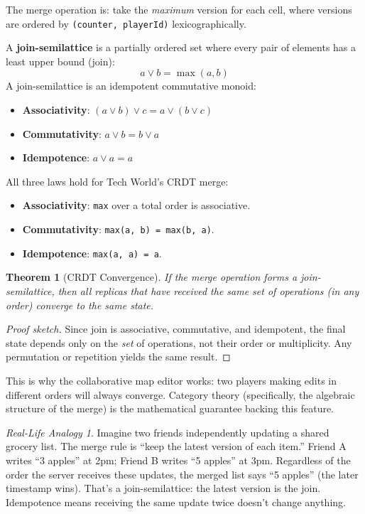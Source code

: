 \documentclass[12pt,a4paper]{article}
\theoremstyle{definition}
\theoremstyle{plain}
\newtheorem{theorem}[definition]{Theorem}
\theoremstyle{remark}
\newtheorem*{reallife}{Real-Life Analogy}
\begin{document}
The merge operation is: take the \emph{maximum} version for each cell,
where versions are ordered by \texttt{(counter, playerId)} lexicographically.

\begin{formal}
A \textbf{join-semilattice} is a partially ordered set where every pair of
elements has a least upper bound (join):
\[
a \vee b = \max(a, b)
\]
A join-semilattice is an idempotent commutative monoid:
\begin{itemize}
  \item \textbf{Associativity}: $(a \vee b) \vee c = a \vee (b \vee c)$
  \item \textbf{Commutativity}: $a \vee b = b \vee a$
  \item \textbf{Idempotence}: $a \vee a = a$
\end{itemize}
\end{formal}

All three laws hold for Tech World's CRDT merge:
\begin{itemize}
  \item \textbf{Associativity}: \texttt{max} over a total order is associative. \checkmark
  \item \textbf{Commutativity}: \texttt{max(a, b) = max(b, a)}. \checkmark
  \item \textbf{Idempotence}: \texttt{max(a, a) = a}. \checkmark
\end{itemize}

\begin{theorem}[CRDT Convergence]
If the merge operation forms a join-semilattice, then all replicas that
have received the same set of operations (in any order) converge to the
same state.
\end{theorem}
\begin{proof}[Proof sketch]
Since join is associative, commutative, and idempotent, the final state
depends only on the \emph{set} of operations, not their order or
multiplicity. Any permutation or repetition yields the same result.
\end{proof}

This is why the collaborative map editor works: two players making edits
in different orders will always converge. Category theory (specifically,
the algebraic structure of the merge) is the mathematical guarantee
backing this feature.

\begin{reallife}
Imagine two friends independently updating a shared grocery list.
The merge rule is ``keep the latest version of each item.''
Friend A writes ``3 apples'' at 2pm; Friend B writes ``5 apples'' at 3pm.
Regardless of the order the server receives these updates, the merged
list says ``5 apples'' (the later timestamp wins).
That's a join-semilattice: the latest version is the join.
Idempotence means receiving the same update twice doesn't change anything.
\end{reallife}
\end{document}
